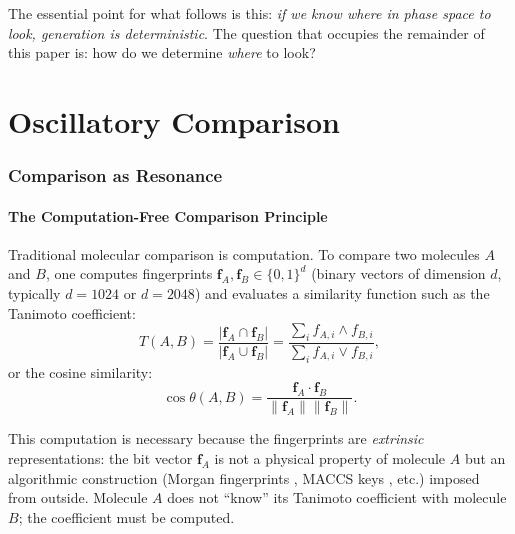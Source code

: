 \documentclass[11pt,twocolumn,a4paper]{article}
\theoremstyle{definition}
\theoremstyle{remark}
\begin{document}
The essential point for what follows is this: \emph{if we know where in phase space to look, generation is deterministic}. The question that occupies the remainder of this paper is: how do we determine \emph{where} to look?

\part{Oscillatory Comparison}\label{part:oscillatory}

\section{Comparison as Resonance}\label{sec:comparison}

\subsection{The Computation-Free Comparison Principle}\label{sec:comp-free}

Traditional molecular comparison is computation. To compare two molecules $A$ and $B$, one computes fingerprints $\mathbf{f}_A, \mathbf{f}_B \in \{0, 1\}^d$ (binary vectors of dimension $d$, typically $d = 1024$ or $d = 2048$) and evaluates a similarity function such as the Tanimoto coefficient:
\begin{equation}\label{eq:tanimoto}
  T(A, B) = \frac{|\mathbf{f}_A \cap \mathbf{f}_B|}{|\mathbf{f}_A \cup \mathbf{f}_B|} = \frac{\sum_i f_{A,i} \wedge f_{B,i}}{\sum_i f_{A,i} \vee f_{B,i}},
\end{equation}
or the cosine similarity:
\begin{equation}\label{eq:cosine}
  \cos\theta(A, B) = \frac{\mathbf{f}_A \cdot \mathbf{f}_B}{\|\mathbf{f}_A\| \|\mathbf{f}_B\|}.
\end{equation}

This computation is necessary because the fingerprints are \emph{extrinsic} representations: the bit vector $\mathbf{f}_A$ is not a physical property of molecule $A$ but an algorithmic construction (Morgan fingerprints \citep{rogers2010}, MACCS keys \citep{weininger1988}, etc.) imposed from outside. Molecule $A$ does not ``know'' its Tanimoto coefficient with molecule $B$; the coefficient must be computed.
\end{document}

